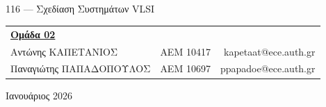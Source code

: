 \begin{titlepage}
	\begin{center}
		\\[4pt]
		\\[4pt]
		\\
		\vfill
		\\[8pt]
		\noindent\Large{{116 --- Σχεδίαση Συστημάτων VLSI}}\\[56pt]
		{\large\begin{tabular}{l c r}
			\multicolumn{3}{l}{\underline{\textbf{Ομάδα 02}}}\\[4pt]
			Αντώνης ΚΑΠΕΤΑΝΙΟΣ & ΑΕΜ 10417 & kapetaat@ece.auth.gr \\
			Παναγιώτης ΠΑΠΑΔΟΠΟΥΛΟΣ & ΑΕΜ 10697 & ppapadoe@ece.auth.gr
		\end{tabular}}
		\vfill
		\noindent\large{Ιανουάριος 2026}
	\end{center}
\end{titlepage}